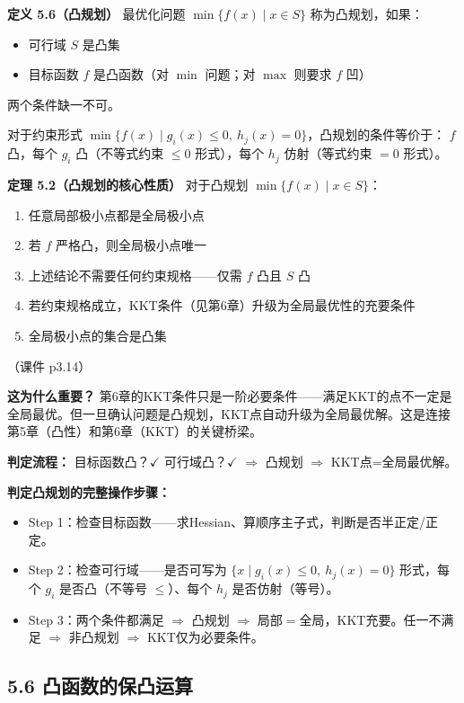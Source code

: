 \textbf{定义 5.6（凸规划）}
最优化问题 $\min\{f(x) \mid x \in S\}$ 称为凸规划，如果：
\begin{itemize}
  \item 可行域 $S$ 是凸集
  \item 目标函数 $f$ 是凸函数（对 $\min$ 问题；对 $\max$ 则要求 $f$ 凹）
\end{itemize}
两个条件缺一不可。

对于约束形式 $\min\{f(x)\mid g_i(x)\le 0,\ h_j(x)=0\}$，凸规划的条件等价于：
$f$ 凸，每个 $g_i$ 凸（不等式约束 $\le 0$ 形式），每个 $h_j$ 仿射（等式约束 $=0$ 形式）。

\textbf{定理 5.2（凸规划的核心性质）}
对于凸规划 $\min\{f(x) \mid x \in S\}$：
\begin{enumerate}
  \item 任意局部极小点都是全局极小点
  \item 若 $f$ 严格凸，则全局极小点唯一
  \item 上述结论不需要任何约束规格——仅需 $f$ 凸且 $S$ 凸
  \item 若约束规格成立，KKT条件（见第6章）升级为全局最优性的充要条件
  \item 全局极小点的集合是凸集
\end{enumerate}

（课件 p3.14）

\textbf{这为什么重要？} 第6章的KKT条件只是一阶必要条件——满足KKT的点不一定是全局最优。但一旦确认问题是凸规划，KKT点自动升级为全局最优解。这是连接第5章（凸性）和第6章（KKT）的关键桥梁。

\textbf{判定流程：} 目标函数凸？$\checkmark$ 可行域凸？$\checkmark$ $\Rightarrow$ 凸规划 $\Rightarrow$ KKT点=全局最优解。

\textbf{判定凸规划的完整操作步骤：}
\begin{itemize}
  \item Step 1：检查目标函数——求Hessian、算顺序主子式，判断是否半正定/正定。
  \item Step 2：检查可行域——是否可写为 $\{x\mid g_i(x)\le0,\ h_j(x)=0\}$ 形式，每个 $g_i$ 是否凸（不等号 $\le$）、每个 $h_j$ 是否仿射（等号）。
  \item Step 3：两个条件都满足 $\Rightarrow$ 凸规划 $\Rightarrow$ 局部$=$全局，KKT充要。任一不满足 $\Rightarrow$ 非凸规划 $\Rightarrow$ KKT仅为必要条件。
\end{itemize}

\subsection{5.6 凸函数的保凸运算}

